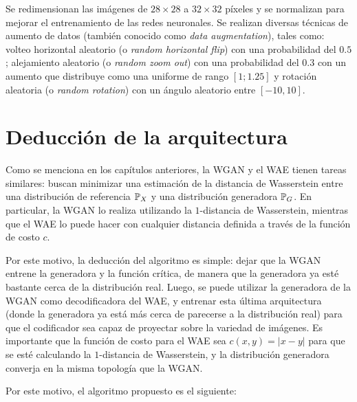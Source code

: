 Se redimensionan las imágenes de $28\times28$ a $32\times32$ píxeles y se normalizan para mejorar el entrenamiento de las redes neuronales. Se realizan diversas técnicas de aumento de datos (también conocido como \textit{data augmentation}), tales como: volteo horizontal aleatorio (o \textit{random horizontal flip}) con una probabilidad del $0.5$; alejamiento aleatorio (o \textit{random zoom out}) con una probabilidad del $0.3$ con un aumento que distribuye como una uniforme de rango $[1; 1.25]$ y rotación aleatoria (o \textit{random rotation}) con un ángulo aleatorio entre $[-10, 10]$.


\section{Deducción de la arquitectura}\label{sec:deduccion-arquitectura-wae-wgan}  %

Como se menciona en los capítulos anteriores, la WGAN y el WAE tienen tareas similares: buscan minimizar una estimación de la distancia de Wasserstein entre una distribución de referencia $\Prob_X$ y una distribución generadora $\Prob_G$. En particular, la WGAN lo realiza utilizando la $1$-distancia de Wasserstein, mientras que el WAE lo puede hacer con cualquier distancia definida a través de la función de costo $c$.

Por este motivo, la deducción del algoritmo es simple: dejar que la WGAN entrene la generadora y la función crítica, de manera que la generadora ya esté bastante cerca de la distribución real. Luego, se puede utilizar la generadora de la WGAN como decodificadora del WAE, y entrenar esta última arquitectura (donde la generadora ya está más cerca de parecerse a la distribución real) para que el codificador sea capaz de proyectar sobre la variedad de imágenes. Es importante que la función de costo para el WAE sea $c(x, y) = |x - y|$ para que se esté calculando la $1$-distancia de Wasserstein, y la distribución generadora converja en la misma topología que la WGAN.


Por este motivo, el algoritmo propuesto es el siguiente:


